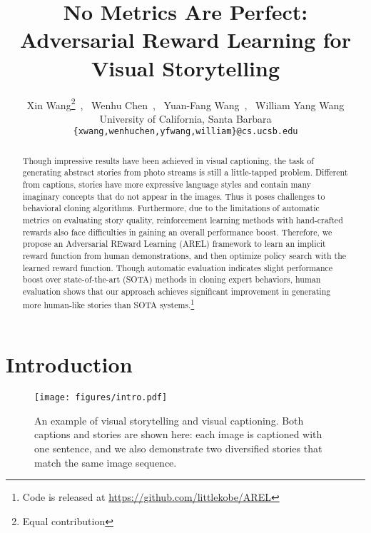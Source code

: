 \documentclass[11pt,a4paper]{article}
\title{No Metrics Are Perfect: \\ Adversarial Reward Learning for Visual Storytelling}
\author{Xin Wang\thanks{\hspace{0.2cm} Equal contribution}~,~ Wenhu Chen\samethanks ~,~ Yuan-Fang Wang~,~ William Yang Wang \\
  University of California, Santa Barbara \\
  {\tt \{xwang,wenhuchen,yfwang,william\}@cs.ucsb.edu}}
\date{}
\begin{document}
\maketitle
\begin{abstract}
Though impressive results have been achieved in visual captioning, the task of generating abstract stories from photo streams is still a little-tapped problem. Different from captions, stories have more expressive language styles and contain many imaginary concepts that do not appear in the images. Thus it poses challenges to behavioral cloning algorithms. Furthermore, due to the limitations of automatic metrics on evaluating story quality, reinforcement learning methods with hand-crafted rewards also face difficulties in gaining an overall performance boost. Therefore, we propose an Adversarial REward Learning (AREL) framework to learn an implicit reward function from human demonstrations, and then optimize policy search with the learned reward function. Though automatic evaluation indicates slight performance boost over state-of-the-art (SOTA) methods in cloning expert behaviors, human evaluation shows that our approach achieves significant improvement in generating more human-like stories than SOTA systems.\footnote{Code is released at \small\url{https://github.com/littlekobe/AREL}}
\end{abstract}

\section{Introduction}

\begin{figure}[!t]
\begin{center}
\texttt{[image: figures/intro.pdf]}  
\end{center}
\caption{An example of visual storytelling and visual captioning. Both captions and stories are shown here: each image is captioned with one sentence, and we also demonstrate two diversified stories that match the same image sequence.}
\label{fig:intro}
\end{figure}
\end{document}

